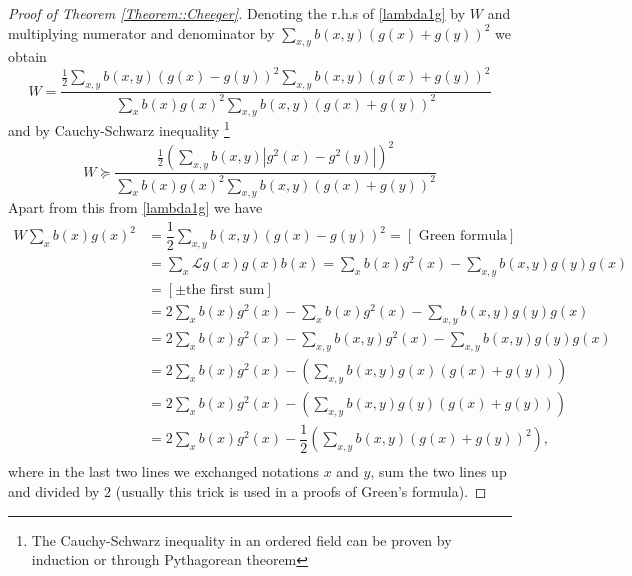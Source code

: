 \documentclass[a4paper,12pt]{amsart}
\theoremstyle{definition}
\renewcommand{\L}{\mathcal{L}}
\newcommand{\weight}{b}
\begin{document}
\begin{proof}[Proof of Theorem \ref{Theorem::Cheeger}]
Denoting the r.h.s of \eqref{lambda1g} by $W$ and multiplying numerator and denominator by $\sum_{x,y} \weight (x,y)(g(x)+g(y))^2$ we obtain
\begin{equation*}
W = \dfrac{\frac{1}{2}\sum_{x,y}\weight (x,y)(g(x)-g(y))^2 \sum_{x,y}\weight (x,y) (g(x)+g(y))^2}{\sum_x \weight (x)g(x)^2 \sum_{x,y} \weight (x,y)(g(x)+g(y))^2}
\end{equation*}
and by Cauchy-Schwarz inequality \footnote{The Cauchy-Schwarz inequality in an ordered field can be proven by induction or through Pythagorean theorem} 
\begin{equation}\label{W1}
W\succeq \dfrac{\frac{1}{2}\left(\sum_{x,y}\weight (x,y)\left|g^2(x)-g^2(y)\right|\right)^2}{\sum_x \weight (x)g(x)^2 \sum_{x,y} \weight (x,y)(g(x)+g(y))^2}
\end{equation}
Apart from this from \eqref{lambda1g} we have
\begin{align*}
W\sum_x \weight (x)g(x)^2&= \dfrac{1}{2}\sum_{x,y} \weight (x,y) (g(x)-g(y))^2 =[\mbox{ Green formula}]\\
&=\sum_{x}\L g(x)g(x)\weight (x)=\sum_{x} \weight (x)g^2(x)- \sum_{x,y} \weight (x,y)g(y)g(x)\\
&=[\pm\mbox{the first sum}]\\
&=2\sum_{x} \weight (x)g^2(x)-\sum_{x} \weight (x)g^2(x) - \sum_{x,y} \weight (x,y) g(y)g(x)\\
&=2\sum_{x} \weight (x)g^2(x)-\sum_{x,y} \weight (x,y)g^2(x) -\sum_{x,y} \weight (x,y) g(y)g(x)\\
&=2\sum_{x} \weight (x)g^2(x)-\left(\sum_{x,y} \weight (x,y)g(x)(g(x)+g(y))\right)\\
&=2\sum_{x} \weight (x)g^2(x)-\left(\sum_{x,y} \weight (x,y)g(y)(g(x)+g(y))\right)\\
&=2\sum_{x} \weight (x)g^2(x)-\dfrac{1}{2}\left(\sum_{x,y} \weight (x,y)(g(x)+g(y))^2\right),\\
\end{align*}
where in the last two lines we exchanged notations $x$ and $y$, sum the two lines up and divided by $2$ (usually this trick is used in a proofs of Green's formula).


\end{proof}
\end{document}
